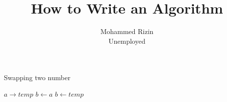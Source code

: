 \documentclass[twocolumn]{article}
\title{How to Write an Algorithm}
\author{Mohammed Rizin \\ Unemployed}
\begin{document}
\maketitle

\begin{algorithm}
\caption{Swapping two number}\label{swap}
\begin{algorithmic}
\State$a \rightarrow temp$
\State$b \gets a$
\State$b \gets temp$
\EndProcedure{}
\end{algorithmic}
\end{algorithm}
\end{document}
